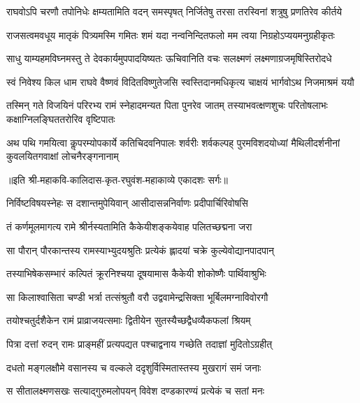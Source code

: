 \twolineshloka
{राघवोऽपि चरणौ तपोनिधेः क्षम्यतामिति वदन् समस्पृषत्}
{निर्जितेषु तरसा तरस्विनां शत्रुषु प्रणतिरेव कीर्तये} %

\fourlineindentedshloka
{राजसत्वमवधूय मातृकं}
{पित्र्यमस्मि गमितः शमं यदा}
{नन्वनिन्दितफलो मम त्वया}
{निग्रहोऽप्ययमनुग्रहीकृतः} %

\fourlineindentedshloka
{साधु याम्यहमविघ्नमस्तु ते}
{देवकार्यमुपपादयिष्यतः}
{ऊचिवानिति वचः सलक्ष्मणं}
{लक्ष्मणाग्रजमृषिस्तिरोदधे} %

\fourlineindentedshloka
{स्वं निवेश्य किल धाम राघवे}
{वैष्णवं विदितविष्णुतेजसि}
{स्वस्तिदानमधिकृत्य चाक्षयं}
{भार्गवोऽथ निजमाश्रमं ययौ} %

\fourlineindentedshloka
{तस्मिन् गते विजयिनं परिरभ्य रामं}
{स्नेहादमन्यत पिता पुनरेव जातम्}
{तस्याभवत्क्षणशुचः परितोषलाभः}
{कक्षाग्निलङ्घिततरोरिव वृष्टिपातः} %

\fourlineindentedshloka
{अथ पथि गमयित्वा कॢपरम्योपकार्ये}
{कतिचिदवनिपालः शर्वरीः शर्वकल्पह्}
{पुरमविशदयोध्यां मैथिलीदर्शनीनां}
{कुवलयितगवाक्षां लोचनैरङ्गनानाम्} %


॥इति श्री-महाकवि-कालिदास-कृत-रघुवंश-महाकाव्ये एकादशः सर्गः॥


\twolineshloka
{निर्विष्टविषयस्नेहः स दशान्तमुपेयिवान्}
{आसीदासन्ननिर्वाणः प्रदीपार्चिरिवोषसि} %

\twolineshloka
{तं कर्णमूलमागत्य रामे श्रीर्नस्यतामिति}
{कैकेयीशङ्कयेवाह पलितच्छद्मना जरा} %

\twolineshloka
{सा पौरान् पौरकान्तस्य रामस्याभ्युदयश्रुतिः}
{प्रत्येकं ह्लादयां चक्रे कुल्येवोद्यानपादपान्} %

\twolineshloka
{तस्याभिषेकसम्भारं कल्पितं क्रूरनिश्चया}
{दूषयामास कैकेयी शोकोष्णैः पार्थिवाश्रुभिः} %

\twolineshloka
{सा किलाश्वासिता चण्डी भर्त्रा तत्संश्रुतौ वरौ}
{उद्ववामेन्द्रसिक्ता भूर्बिलमग्नाविवोरगौ} %

\twolineshloka
{तयोश्चतुर्दशैकेन रामं प्राव्राजयत्समाः}
{द्वितीयेन सुतस्यैच्छद्वैधव्यैकफलां श्रियम्} %

\twolineshloka
{पित्रा दत्तां रुदन् रामः प्राङ्महीं प्रत्यपद्यत}
{पश्चाद्वनाय गच्छेति तदाज्ञां मुदितोऽग्रहीत्} %

\twolineshloka
{दधतो मङ्गलक्षौमे वसानस्य च वल्कले}
{ददृशुर्विस्मितास्तस्य मुखरागं समं जनाः} %

\twolineshloka
{स सीतालक्ष्मणसखः सत्याद्गुरुमलोपयन्}
{विवेश दण्डकारण्यं प्रत्येकं च सतां मनः} %

